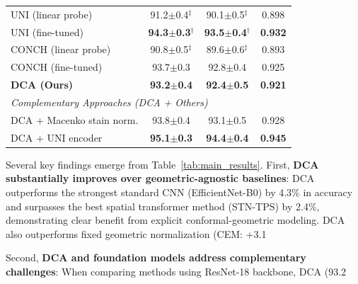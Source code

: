 \documentclass[10pt,journal,compsoc]{IEEEtran}
\begin{document}
\begin{table}[t]
\begin{tabular}{lccc}
UNI (linear probe) & 91.2$\pm$0.4$^\ddagger$ & 90.1$\pm$0.5$^\ddagger$ & 0.898 \\
UNI (fine-tuned) & \textbf{94.3$\pm$0.3}$^\dagger$ & \textbf{93.5$\pm$0.4}$^\dagger$ & \textbf{0.932} \\
CONCH (linear probe) & 90.8$\pm$0.5$^\ddagger$ & 89.6$\pm$0.6$^\ddagger$ & 0.893 \\
CONCH (fine-tuned) & 93.7$\pm$0.3 & 92.8$\pm$0.4 & 0.925 \\
\hline
\textbf{DCA (Ours)} & \textbf{93.2$\pm$0.4} & \textbf{92.4$\pm$0.5} & \textbf{0.921} \\
\hline
\multicolumn{4}{l}{\textit{Complementary Approaches (DCA + Others)}} \\
DCA + Macenko stain norm. & 93.8$\pm$0.4 & 93.1$\pm$0.5 & 0.928 \\
DCA + UNI encoder & \textbf{95.1$\pm$0.3} & \textbf{94.4$\pm$0.4} & \textbf{0.945} \\
\hline
\end{tabular}
\end{table}

Several key findings emerge from Table~\ref{tab:main_results}. First, \textbf{DCA substantially improves over geometric-agnostic baselines}: DCA outperforms the strongest standard CNN (EfficientNet-B0) by 4.3\% in accuracy and surpasses the best spatial transformer method (STN-TPS) by 2.4\%, demonstrating clear benefit from explicit conformal-geometric modeling. DCA also outperforms fixed geometric normalization (CEM: +3.1%

Second, \textbf{DCA and foundation models address complementary challenges}: When comparing methods using ResNet-18 backbone, DCA (93.2%
\end{document}
